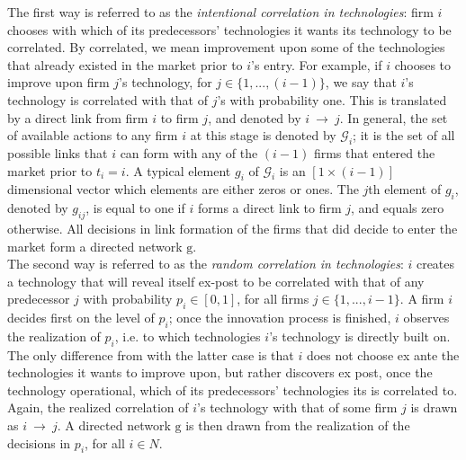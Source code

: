\documentclass[11pt]{article}
\begin{document}
\indent  The first way is referred to as the \textit{intentional correlation in technologies}: firm $i$ chooses with which of its predecessors' technologies it wants its technology to be correlated. By correlated, we mean improvement upon some of the technologies that already existed in the market prior to $i$'s entry. For example, if $i$ chooses to improve upon firm $j$'s technology, for $j\in \{1,...,(i-1)\}$, we say that $i$'s technology is correlated with that of $j$'s with probability one. This is translated by a direct link from firm $i$ to firm $j$, and denoted by $i~\rightarrow ~j$. In general, the set of available actions to any firm $i$ at this stage is denoted by $\mathcal{G}_i$; it is the set of all possible links that $i$ can form with any of the $(i-1)$ firms that entered the market prior to $t_i=i$. A typical element $g_i$ of $\mathcal{G}_i$ is an $[1\times (i-1)]$ dimensional vector which elements are either zeros or ones. The $j$th element of $g_i$, denoted by $g_{ij}$, is equal to one if $i$ forms a direct link to firm $j$, and equals zero otherwise. All decisions in link formation of the firms that did decide to enter the market form a directed network $\text{g}$. \\
\indent The second way is referred to as the \textit{random correlation in technologies}: $i$ creates a technology that will reveal itself ex-post to be correlated with that of any predecessor $j$ with probability $p_i\in [0,1]$, for all firms $j\in \{1,...,i-1\}$. A firm $i$ decides first on the level of $p_i$; once the innovation process is finished, $i$ observes the realization of $p_i$, i.e. to which technologies $i$'s technology is directly built on. The only difference from with the latter case is that $i$ does not choose ex ante the technologies it wants to improve upon, but rather discovers ex post, once the technology operational, which of its predecessors' technologies its is correlated to. Again, the realized correlation of $i$'s technology with that of some firm $j$ is drawn as $i ~\rightarrow~j$. A directed network $\text{g}$ is then drawn from the realization of the decisions in $p_i$, for all $i\in N$.  \\
 
\end{document}
